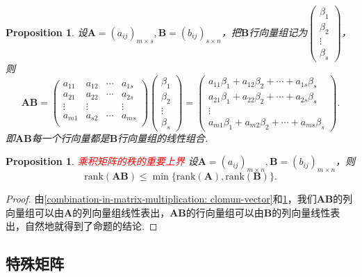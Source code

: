 \documentclass{article}
\newtheorem{proposition}[theorem]{Proposition}
\newcommand{\mbf}[1]{\bm{#1}}
\newcommand{\rank}[1]{\text{rank}\left(#1\right)} %
\newcommand{\redt}[1]{\textcolor{red}{#1}}
\begin{document}
\begin{proposition}\label{combination-in-matrix-multiplication: row-vector}
\rm 设$\mbf{A}=(a_{ij})_{m \times s},\mbf{B}=(b_{ij})_{s \times n}$，把$\mbf{B}$行向量组记为$\begin{pmatrix}
\beta_1 \\ \beta_2 \\ \vdots \\ \beta_s
\end{pmatrix}$，则
$$
\mbf{A}\mbf{B} = \begin{pmatrix}
a_{11} & a_{12} & \cdots & a_{1s} \\
a_{21} & a_{22} & \cdots & a_{2s} \\
\vdots & \vdots & 		 & \vdots \\
a_{m1} & a_{s2} & \cdots & a_{ms} \\
\end{pmatrix} \begin{pmatrix}
\beta_1 \\ \beta_2 \\ \vdots \\ \beta_s
\end{pmatrix} = 
\begin{pmatrix}
a_{11}\beta_1 + a_{12}\beta_2 + \cdots + a_{1s}\beta_s \\
a_{21}\beta_1 + a_{22}\beta_2 + \cdots + a_{2s}\beta_s \\
\vdots \\
a_{m1}\beta_1 + a_{m2}\beta_2 + \cdots + a_{ms}\beta_s 
\end{pmatrix}.
$$
即$\mbf{A}\mbf{B}$每一个行向量都是$\mbf{B}$行向量组的线性组合.
\end{proposition}

\begin{proposition}\label{matrix-mul: rank}
\rm \redt{乘积矩阵的秩的重要上界} 设$\mbf{A}=(a_{ij})_{m\times n},\mbf{B} = (b_{ij})_{m\times n}$，则
$$
\rank{\mbf{A}\mbf{B}} \leq \min\{\rank{\mbf{A}}, \rank{\mbf{B}}\}.
$$
\end{proposition}

\begin{proof}
由\ref{combination-in-matrix-multiplication: clomun-vector}和\ref{combination-in-matrix-multiplication: row-vector}，我们$\mbf{AB}$的列向量组可以由$\mbf{A}$的列向量组线性表出，$\mbf{AB}$的行向量组可以由$\mbf{B}$的列向量线性表出，自然地就得到了命题的结论. 
\end{proof}


\subsection{特殊矩阵}
\end{document}
